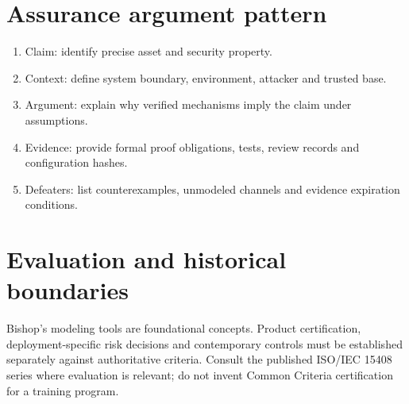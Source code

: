 \documentclass[10pt,letterpaper]{article}
\begin{document}
\section{Assurance argument pattern}
\begin{enumerate}
\item Claim: identify precise asset and security property.
\item Context: define system boundary, environment, attacker and trusted base.
\item Argument: explain why verified mechanisms imply the claim under assumptions.
\item Evidence: provide formal proof obligations, tests, review records and configuration hashes.
\item Defeaters: list counterexamples, unmodeled channels and evidence expiration conditions.
\end{enumerate}
\section{Evaluation and historical boundaries}
Bishop's modeling tools are foundational concepts. Product certification, deployment-specific risk decisions and contemporary controls must be established separately against authoritative criteria. Consult the published ISO/IEC 15408 series where evaluation is relevant; do not invent Common Criteria certification for a training program.
\end{document}
